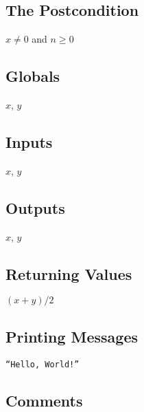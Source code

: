 \documentclass{amsart}
\begin{document}
\subsection{The Postcondition}

\begin{algorithmic}[1]
    \ENSURE $x \neq 0$ and $n \geq 0$
\end{algorithmic}

\subsection{Globals}

\begin{algorithmic}[1]
    \GLOBALS $x$, $y$
\end{algorithmic}

\subsection{Inputs}

\begin{algorithmic}[1]
    \INPUTS[comment]
        \STATE $x$, $y$
    \ENDINPUTS
\end{algorithmic}

\subsection{Outputs}

\begin{algorithmic}[1]
    \OUTPUTS[comment]
        \STATE $x$, $y$
    \ENDOUTPUTS
\end{algorithmic}

\subsection{Returning Values}

\begin{algorithmic}[1]
\RETURN $(x+y)/2$
\end{algorithmic}

\subsection{Printing Messages}

\begin{algorithmic}[1]
\PRINT \texttt{``Hello, World!''}
\end{algorithmic}

\subsection{Comments}
\end{document}
